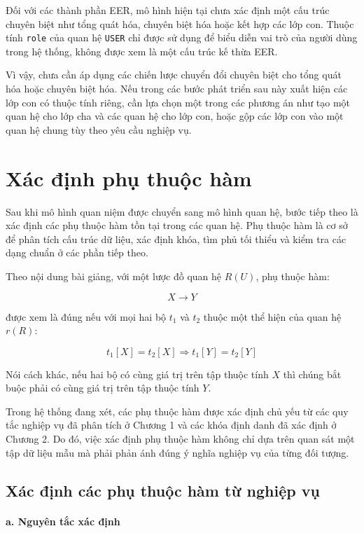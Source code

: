Đối với các thành phần EER, mô hình hiện tại chưa xác định một cấu trúc chuyên biệt như tổng quát hóa, chuyên biệt hóa hoặc kết hợp các lớp con. Thuộc tính \texttt{role} của quan hệ \texttt{USER} chỉ được sử dụng để biểu diễn vai trò của người dùng trong hệ thống, không được xem là một cấu trúc kế thừa EER.

Vì vậy, chưa cần áp dụng các chiến lược chuyển đổi chuyên biệt cho tổng quát hóa hoặc chuyên biệt hóa. Nếu trong các bước phát triển sau này xuất hiện các lớp con có thuộc tính riêng, cần lựa chọn một trong các phương án như tạo một quan hệ cho lớp cha và các quan hệ cho lớp con, hoặc gộp các lớp con vào một quan hệ chung tùy theo yêu cầu nghiệp vụ.

\section{Xác định phụ thuộc hàm}

Sau khi mô hình quan niệm được chuyển sang mô hình quan hệ, bước tiếp theo là xác định các phụ thuộc hàm tồn tại trong các quan hệ. Phụ thuộc hàm là cơ sở để phân tích cấu trúc dữ liệu, xác định khóa, tìm phủ tối thiểu và kiểm tra các dạng chuẩn ở các phần tiếp theo.

Theo nội dung bài giảng, với một lược đồ quan hệ $R(U)$, phụ thuộc hàm:

$$X \rightarrow Y$$

được xem là đúng nếu với mọi hai bộ $t_1$ và $t_2$ thuộc một thể hiện của quan hệ $r(R)$:

$$t_1[X] = t_2[X] \Rightarrow t_1[Y] = t_2[Y]$$

Nói cách khác, nếu hai bộ có cùng giá trị trên tập thuộc tính $X$ thì chúng bắt buộc phải có cùng giá trị trên tập thuộc tính $Y$.

Trong hệ thống đang xét, các phụ thuộc hàm được xác định chủ yếu từ các quy tắc nghiệp vụ đã phân tích ở Chương 1 và các khóa định danh đã xác định ở Chương 2. Do đó, việc xác định phụ thuộc hàm không chỉ dựa trên quan sát một tập dữ liệu mẫu mà phải phản ánh đúng ý nghĩa nghiệp vụ của từng đối tượng.

\subsection{Xác định các phụ thuộc hàm từ nghiệp vụ}

\paragraph{a. Nguyên tắc xác định}\mbox{}\par

